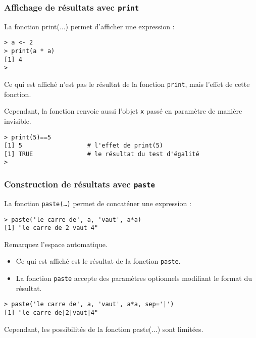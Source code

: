 \documentclass[10pt]{beamer}
\begin{document}
\begin{frame}[fragile]
  \frametitle{Affichage de résultats avec \texttt{print}}
  La fonction print(...) permet d'afficher une expression :
  \begin{lstlisting}
> a <- 2
> print(a * a)
[1] 4
>
\end{lstlisting}

Ce qui est affiché n'est pas le résultat de la fonction \texttt{print}, mais l'effet de cette fonction.

Cependant, la fonction renvoie aussi l'objet \texttt{x} passé en paramètre de manière invisible.
\begin{lstlisting}
> print(5)==5
[1] 5                  # l'effet de print(5)
[1] TRUE               # le résultat du test d'égalité
>
\end{lstlisting}
\end{frame}


\begin{frame}[fragile]
\frametitle{Construction de résultats avec \texttt{paste}}
La fonction \texttt{paste(\dots)} permet de concaténer une expression :
\begin{lstlisting}
> paste('le carre de', a, 'vaut', a*a)
[1] "le carre de 2 vaut 4"
\end{lstlisting}
Remarquez l'espace automatique.

\begin{itemize}
\item Ce qui est affiché est le \alert{résultat} de la fonction \texttt{paste}.
\item La fonction \texttt{paste} accepte des paramètres optionnels modifiant le format du résultat.
\end{itemize}
\begin{lstlisting}
> paste('le carre de', a, 'vaut', a*a, sep='|')
[1] "le carre de|2|vaut|4"
\end{lstlisting}
Cependant, les possibilités de la fonction paste(...) sont limitées.

\end{frame}
\end{document}

